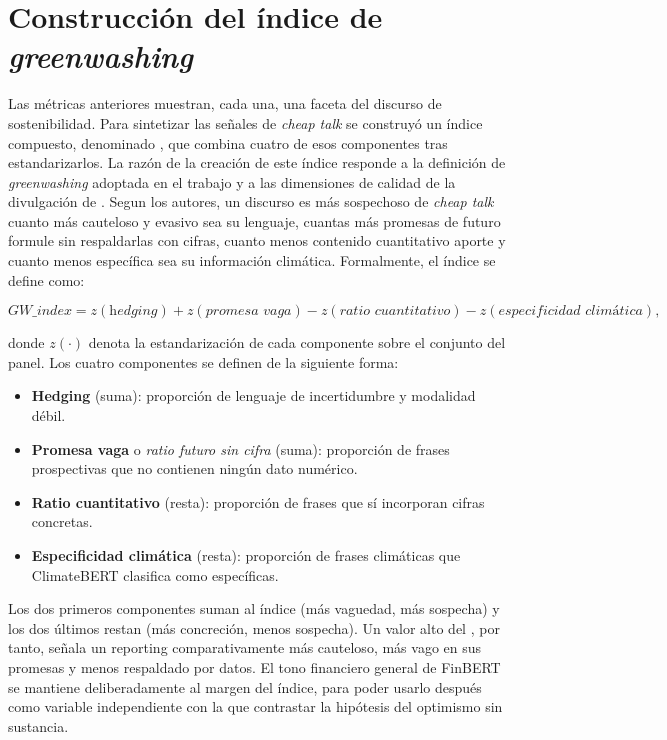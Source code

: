 \section{Construcción del índice de \textit{greenwashing}}
\label{sec:gwindex}

Las métricas anteriores muestran, cada una, una faceta del discurso de sostenibilidad. Para
sintetizar las señales de \textit{cheap talk} se construyó un
índice compuesto, denominado \gwindex{}, que combina cuatro de esos componentes tras
estandarizarlos. La razón de la creación de este índice responde a la definición de
\textit{greenwashing} adoptada en el trabajo y a las dimensiones de calidad de la divulgación de
\textcite{michelon2015}. Segun los autores, un discurso es más sospechoso de \textit{cheap talk} cuanto más
cauteloso y evasivo sea su lenguaje, cuantas más promesas de futuro formule sin respaldarlas con
cifras, cuanto menos contenido cuantitativo aporte y cuanto menos específica sea su información
climática. Formalmente, el índice se define como:

\[
\textit{GW\_index} = z(\textit{hedging}) + z(\textit{promesa vaga})
- z(\textit{ratio cuantitativo}) - z(\textit{especificidad climática}),
\]

\noindent donde $z(\cdot)$ denota la estandarización de cada componente sobre el conjunto del
panel. Los cuatro componentes se definen de la siguiente forma:

\begin{itemize}
    \item \textbf{Hedging} (suma): proporción de lenguaje de incertidumbre y modalidad débil.
    \item \textbf{Promesa vaga} o \textit{ratio futuro sin cifra} (suma): proporción de frases
    prospectivas que no contienen ningún dato numérico.
    \item \textbf{Ratio cuantitativo} (resta): proporción de frases que sí incorporan cifras
    concretas.
    \item \textbf{Especificidad climática} (resta): proporción de frases climáticas que
    ClimateBERT clasifica como específicas.
\end{itemize}

\noindent Los dos primeros componentes suman al índice (más vaguedad, más sospecha) y los dos
últimos restan (más concreción, menos sospecha). Un valor alto del \gwindex{}, por tanto, señala
un reporting comparativamente más cauteloso, más vago en sus promesas y menos respaldado por
datos. El tono financiero general de FinBERT se mantiene deliberadamente al margen del índice,
para poder usarlo después como variable independiente con la que contrastar la hipótesis del
optimismo sin sustancia.

